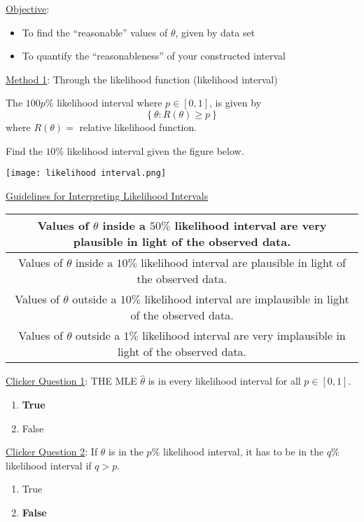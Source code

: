 \underline{Objective}:
\begin{itemize}
    \item To find the ``reasonable'' values of $ \theta $, given by data set
    \item To quantify the ``reasonableness'' of your constructed interval
\end{itemize}
\underline{Method 1}: Through the likelihood function (likelihood interval)
\begin{defbox}
    \begin{definition}
        The $ 100p\% $ likelihood interval where $ p\in[0,1] $, is given by
        \[ \left\{ \theta:R(\theta)\geqslant p\right\} \]
        where $ R(\theta)= $ relative likelihood function.
    \end{definition}
\end{defbox}
\begin{exbox}
    \begin{example}
        Find the $ 10\% $ likelihood interval given the figure below.
        \begin{center}
            \texttt{[image: likelihood interval.png]}
        \end{center}
    \end{example}
\end{exbox}
\begin{center}
    \underline{Guidelines for Interpreting Likelihood Intervals}
\end{center}
\begin{center}
    \begin{tabular}{|c|}
        \hline
        Values of $ \theta $ inside a $ 50\% $ likelihood interval are very plausible in light of
        the observed data. \\
        \hline
        Values of $ \theta $ inside a $ 10\% $ likelihood interval are plausible in light of
        the observed data. \\
        \hline
        Values of $ \theta $ outside a $ 10\% $ likelihood interval are implausible in light of
        the observed data. \\
        \hline
        Values of $ \theta $ outside a $ 1\% $ likelihood interval are very implausible in light of
        the observed data. \\
        \hline
    \end{tabular}
\end{center}
\underline{Clicker Question 1}: THE MLE $ \hat{\theta} $ is in every likelihood
interval for all $ p\in[0,1] $.
\begin{enumerate}[label=(\alph*)]
    \item \textbf{True}
    \item False
\end{enumerate}
\underline{Clicker Question 2}: If $ \theta $ is in the $ p\% $ likelihood
interval, it has to be in the $ q\% $ likelihood interval if $ q>p $.
\begin{enumerate}[label=(\alph*)]
    \item True
    \item \textbf{False}
\end{enumerate}
